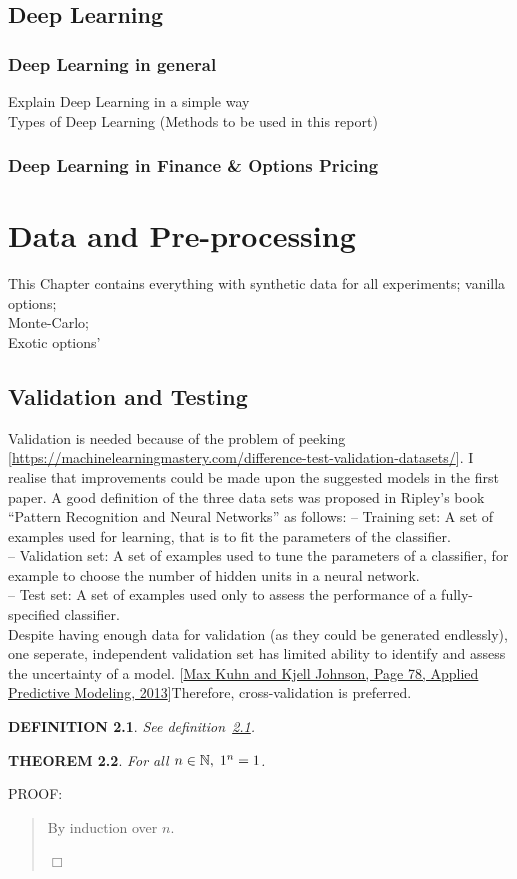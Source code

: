 \documentclass{report}
\newtheorem{theorem}{THEOREM}
\newtheorem{definition}[theorem]{DEFINITION}
\newenvironment{proof}{
PROOF:
\begin{quotation}}{
$\Box$ \end{quotation}}
\newcommand{\nats}{\mbox{\( \mathbb N \)}}
\begin{document}
\section{Deep Learning}
\subsection{Deep Learning in general}
Explain Deep Learning in a simple way\\
Types of Deep Learning (Methods to be used in this report)
\subsection{Deep Learning in Finance & Options Pricing}


\chapter{Data and Pre-processing}
This Chapter contains everything with synthetic data for all experiments;
vanilla options;\\
Monte-Carlo;\\
Exotic options'\\
\section{Validation and Testing}
Validation is needed because of the problem of peeking [\url{https://machinelearningmastery.com/difference-test-validation-datasets/}]. I realise that improvements could be made upon the suggested models in the first paper. 
A good definition of the three data sets was proposed in Ripley’s book “Pattern Recognition and Neural Networks” as follows:
– Training set: A set of examples used for learning, that is to fit the parameters of the classifier.\\
– Validation set: A set of examples used to tune the parameters of a classifier, for example to choose the number of hidden units in a neural network.\\
– Test set: A set of examples used only to assess the performance of a fully-specified classifier.\\
Despite having enough data for validation (as they could be generated endlessly), one seperate, independent validation set has limited ability to identify and assess the uncertainty of a model. [\url{Max Kuhn and Kjell Johnson, Page 78, Applied Predictive Modeling, 2013}]Therefore, cross-validation is preferred.
\begin{definition}\label{def}
See definition~\ref{def}.
\end{definition}
\begin{theorem}
For all $n\in\nats,\; 1^n=1$.
\end{theorem}
\begin{proof}
By induction over $n$.
\end{proof}
\end{document}
